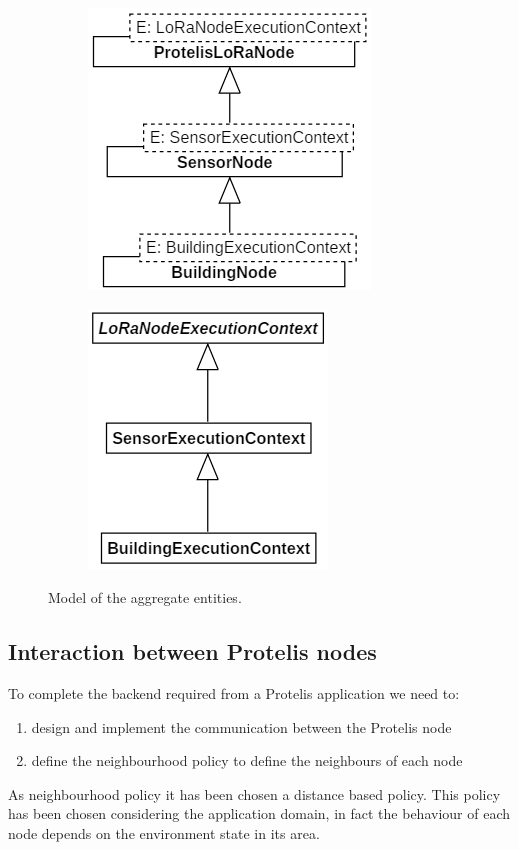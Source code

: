 \begin{figure}[h]
    \centering
    \begin{subfigure}{.495\textwidth}
        \centering
        \includegraphics{figures/NodeAC_caseStudy.png}
        \caption{}
        \label{fig:caseBmodel_a}
    \end{subfigure}
    \begin{subfigure}{.495\textwidth}
        \centering
        \includegraphics{figures/ECAC_caseStudy.png}
        \caption{}
        \label{fig:caseBmodel_b}
    \end{subfigure}
    \caption{Model of the aggregate entities.}
    \label{fig:caseBmodel}
\end{figure}
\subsection*{Interaction between Protelis nodes}
To complete the backend required from a Protelis application we need to:
\begin{enumerate}
    \item design and implement the communication between the Protelis node
    \item define the neighbourhood policy to define the neighbours of each node
\end{enumerate}
As neighbourhood policy it has been chosen a distance based policy. 
This policy has been chosen considering the application domain, in fact the behaviour of each node depends on the environment state in its area. 

